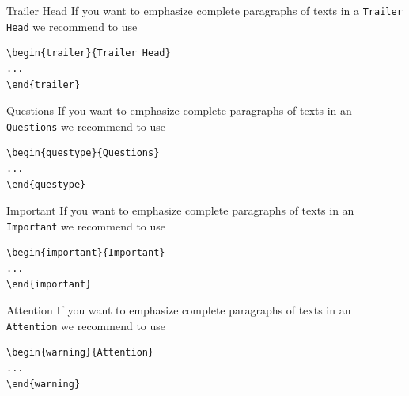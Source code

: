 \begin{trailer}{Trailer Head}
	If you want to emphasize complete paragraphs of texts in a \verb|Trailer Head| we recommend to
	use  \begin{verbatim}\begin{trailer}{Trailer Head}
...
\end{trailer}\end{verbatim}
\end{trailer}
%
\begin{questype}{Questions}
	If you want to emphasize complete paragraphs of texts in an \verb|Questions| we recommend to
	use  \begin{verbatim}\begin{questype}{Questions}
...
\end{questype}\end{verbatim}
\end{questype}
%
%
\begin{important}{Important}
	If you want to emphasize complete paragraphs of texts in an \verb|Important| we recommend to
	use  \begin{verbatim}\begin{important}{Important}
...
\end{important}\end{verbatim}
\end{important}
%
\clearpage
\begin{warning}{Attention}
	If you want to emphasize complete paragraphs of texts in an \verb|Attention| we recommend to
	use  \begin{verbatim}\begin{warning}{Attention}
...
\end{warning}\end{verbatim}
\end{warning}

